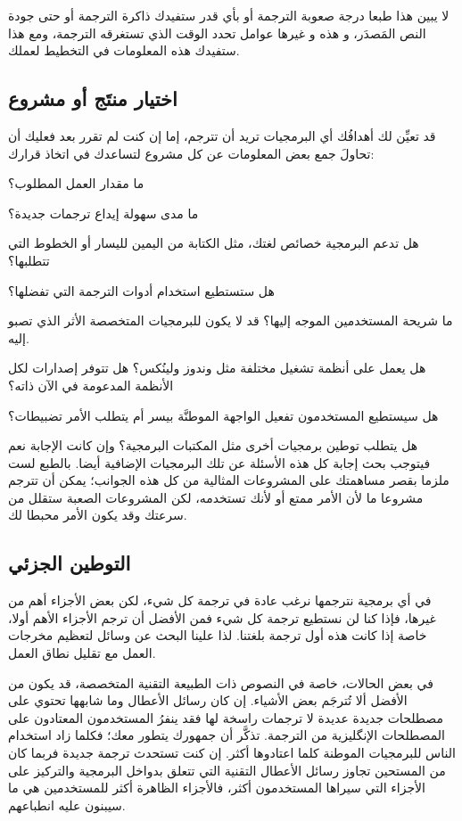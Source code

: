 لا يبين هذا طبعا درجة صعوبة الترجمة أو بأي قدر ستفيدك ذاكرة الترجمة أو
حتى جودة النص المَصدَر، و هذه و غيرها عوامل تحدد الوقت الذي تستغرقه
الترجمة، ومع هذا ستفيدك هذه المعلومات في التخطيط لعملك.

\subsection[ref:36346325]{اختيار منتَج أو مشروع}
قد تعيِّن لك أهدافُك أي البرمجيات
تريد أن تترجم، إما إن كنت لم تقرر بعد فعليك أن تحاولَ جمع بعض المعلومات
عن كل مشروع لتساعدك في اتخاذ قرارك:

\startitemize[1]
\item ما مقدار العمل المطلوب؟
\item ما مدى سهولة إيداع ترجمات جديدة؟
\item هل تدعم البرمجية خصائص لغتك، مثل الكتابة من اليمين لليسار أو
الخطوط التي تتطلبها؟
\item هل ستستطيع استخدام أدوات الترجمة التي تفضلها؟
\item ما شريحة المستخدمين الموجه إليها؟ قد لا يكون للبرمجيات المتخصصة
الأثر الذي تصبو إليه.
\item هل يعمل على أنظمة تشغيل مختلفة مثل وندوز ولينُكس؟ هل تتوفر إصدارات
لكل الأنظمة المدعومة في الآن ذاته؟
\item هل سيستطيع المستخدمون تفعيل الواجهة الموطنَّة بيسر أم يتطلب الأمر
تضبيطات؟
\item هل يتطلب توطين برمجيات أخرى مثل المكتبات البرمجية؟ وإن كانت
الإجابة نعم فيتوجب بحث إجابة كل هذه الأسئلة عن تلك البرمجيات الإضافية
أيضا.
\stopitemize
بالطبع لست ملزما بقصر مساهمتك على المشروعات المثالية من كل هذه الجوانب؛
يمكن أن تترجم مشروعا ما لأن الأمر ممتع أو لأنك تستخدمه، لكن المشروعات
الصعبة ستقلل من سرعتك وقد يكون الأمر محبطا لك.

\subsection{التوطين الجزئي}
في أي برمجية نترجمها نرغب عادة في ترجمة كل شيء، لكن بعض الأجزاء أهم من
غيرها، فإذا كنا لن نستطيع ترجمة كل شيء فمن الأفضل أن ترجم الأجزاء الأهم
أولا، خاصة إذا كانت هذه أول ترجمة بلغتنا. لذا علينا البحث عن وسائل
لتعظيم مخرجات العمل مع تقليل نطاق العمل.

في بعض الحالات، خاصة في النصوص ذات الطبيعة التقنية المتخصصة، قد يكون من
الأفضل ألا تُترجَم بعض الأشياء. إن كان رسائل الأعطال وما شابهها تحتوي
على مصطلحات جديدة عديدة لا ترجمات راسخة لها فقد ينفرُ المستخدمون
المعتادون على المصطلحات الإنگليزية من الترجمة. تذكَّر أن جمهورك يتطور
معك؛ فكلما زاد استخدام الناس للبرمجيات الموطنة كلما اعتادوها أكثر. إن
كنت تستحدث ترجمة جديدة فربما كان من المستحين تجاوز رسائل الأعطال
التقنية التي تتعلق بدواخل البرمجية والتركيز على الأجزاء التي سيراها
المستخدمون أكثر، فالأجزاء الظاهرة أكثر للمستخدمين هي ما سيبنون عليه
انطباعهم.

